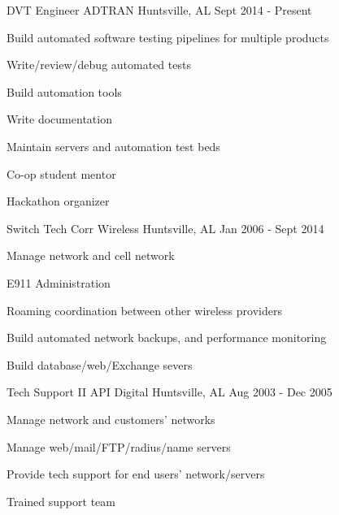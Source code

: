
\begin{cventries}
  \cventry
    {DVT Engineer} %
    {ADTRAN} %
    {Huntsville, AL} %
    {Sept 2014 - Present} %
    {
      \begin{cvitems} %
        \item {Build automated software testing pipelines for multiple products}
        \item {Write/review/debug automated tests}
        \item {Build automation tools}
        \item {Write documentation}
        \item {Maintain servers and automation test beds}
        \item {Co-op student mentor}
        \item {Hackathon organizer}
      \end{cvitems}
    }

  \cventry
    {Switch Tech} %
    {Corr Wireless} %
    {Huntsville, AL} %
    {Jan 2006 - Sept 2014} %
    {
      \begin{cvitems} %
        \item {Manage network and cell network}
        \item {E911 Administration}
        \item {Roaming coordination between other wireless providers}
        \item {Build automated network backups, and performance monitoring}
        \item {Build database/web/Exchange severs}
      \end{cvitems}
    }

  \cventry
    {Tech Support II} %
    {API Digital} %
    {Huntsville, AL} %
    {Aug 2003 - Dec 2005} %
    {
      \begin{cvitems} %
        \item {Manage network and customers' networks}
        \item {Manage web/mail/FTP/radius/name servers}
        \item {Provide tech support for end users' network/servers}
        \item {Trained support team}
      \end{cvitems}
    }

\end{cventries}

